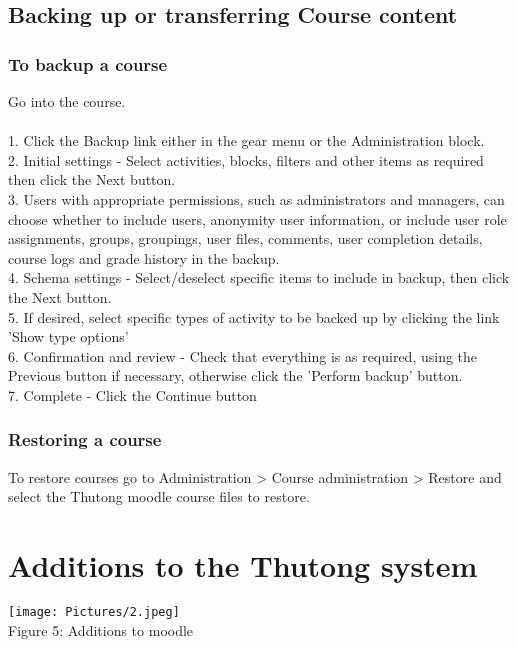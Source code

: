 \documentclass[english]{article}
\begin{document}
	
\subsection{Backing up or transferring Course content}

\subsubsection{To backup a course}

Go into the course. \\\\
1. Click the Backup link either in the gear menu or the Administration block.\\
2. Initial settings - Select activities, blocks, filters and other items as required then click the Next button. \\ 
3. Users with appropriate permissions, such as administrators and managers, can choose whether to include users, anonymity user information, or include user role assignments, groups, groupings, user files, comments, user completion details, course logs and grade history in the backup.\\
4. Schema settings - Select/deselect specific items to include in backup, then click the Next button.\\
5. If desired, select specific types of activity to be backed up by clicking the link 'Show type options'\\
6. Confirmation and review - Check that everything is as required, using the Previous button if necessary, otherwise click the 'Perform backup' button.\\
7. Complete - Click the Continue button

\subsubsection{Restoring a course}
To restore courses go to Administration > Course administration > Restore and select the Thutong moodle course files to restore.





		\section{Additions to the Thutong system}
\texttt{[image: Pictures/2.jpeg]} \\
Figure 5: Additions to moodle \\\\
\end{document}
